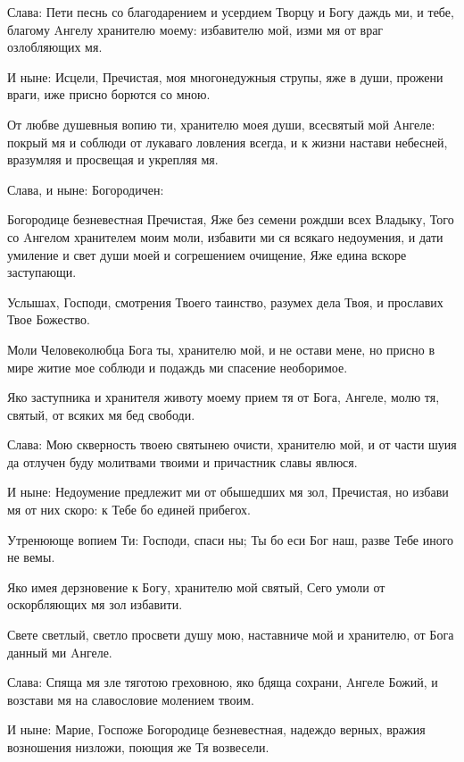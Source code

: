   Слава: Пети песнь со благодарением и усердием Творцу и Богу даждь ми, и тебе, благому Aнгелу хранителю моему: избавителю мой, изми мя от враг озлобляющих мя.


  И ныне: Исцели, Пречистая, моя многонедужныя струпы, яже в души, прожени враги, иже присно борются со мною. 
  


От любве душевныя вопию ти, хранителю моея души, всесвятый мой Aнгеле: покрый мя и соблюди от лукаваго ловления всегда, и к жизни настави небесней, вразумляя и просвещая и укрепляя мя.


  Слава, и ныне: Богородичен:


  Богородице безневестная Пречистая, Яже без семени рождши всех Владыку, Того со Aнгелом хранителем моим моли, избавити ми ся всякаго недоумения, и дати умиление и свет души моей и согрешением очищение, Яже едина вскоре заступающи.
  


Услышах, Господи, смотрения Твоего таинство, разумех дела Твоя, и прославих Твое Божество.


  Моли Человеколюбца Бога ты, хранителю мой, и не остави мене, но присно в мире житие мое соблюди и подаждь ми спасение необоримое.


  Яко заступника и хранителя животу моему прием тя от Бога, Aнгеле, молю тя, святый, от всяких мя бед свободи.


  Слава: Мою скверность твоею святынею очисти, хранителю мой, и от части шуия да отлучен буду молитвами твоими и причастник славы явлюся.


  И ныне: Недоумение предлежит ми от обышедших мя зол, Пречистая, но избави мя от них скоро: к Тебе бо единей прибегох.






  Утренююще вопием Ти: Господи, спаси ны; Ты бо еси Бог наш, разве Тебе иного не вемы.


  Яко имея дерзновение к Богу, хранителю мой святый, Сего умоли от оскорбляющих мя зол избавити.


  Свете светлый, светло просвети душу мою, наставниче мой и хранителю, от Бога данный ми Aнгеле.


  Слава: Спяща мя зле тяготою греховною, яко бдяща сохрани, Aнгеле Божий, и возстави мя на славословие молением твоим.


  И ныне: Марие, Госпоже Богородице безневестная, надеждо верных, вражия возношения низложи, поющия же Тя возвесели.




